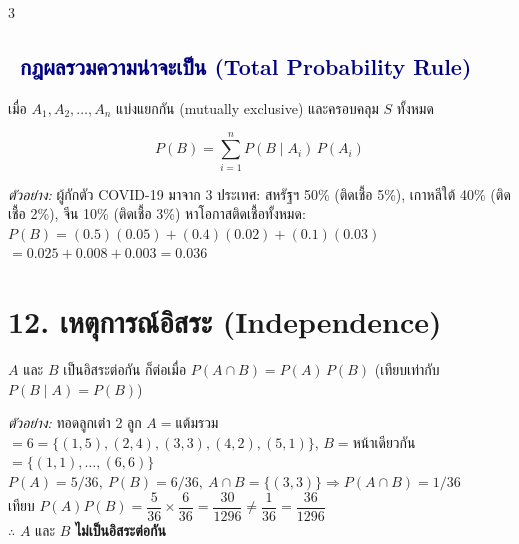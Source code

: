 \documentclass[9pt]{extarticle}
\newcommand{\dist}[1]{\subsection*{\textcolor{navy}{\textbullet\ #1}}}
\begin{document}
\begin{multicols}{3}
\dist{กฎผลรวมความน่าจะเป็น (Total Probability Rule)}
เมื่อ $A_1,A_2,\dots,A_n$ แบ่งแยกกัน (mutually exclusive) และครอบคลุม $S$ ทั้งหมด
\begin{formulabox}
$$P(B)=\sum_{i=1}^nP(B\mid A_i)\,P(A_i)$$
\end{formulabox}
\begin{solbox}
\textit{ตัวอย่าง:} ผู้กักตัว COVID-19 มาจาก 3 ประเทศ: สหรัฐฯ 50\% (ติดเชื้อ 5\%), เกาหลีใต้ 40\% (ติดเชื้อ 2\%), จีน 10\% (ติดเชื้อ 3\%) หาโอกาสติดเชื้อทั้งหมด:\\
$P(B)=(0.5)(0.05)+(0.4)(0.02)+(0.1)(0.03)$\\
$=0.025+0.008+0.003=0.036$
\end{solbox}

\section*{12. เหตุการณ์อิสระ (Independence)}
$A$ และ $B$ เป็นอิสระต่อกัน ก็ต่อเมื่อ $P(A\cap B)=P(A)\,P(B)$ (เทียบเท่ากับ $P(B\mid A)=P(B)$)
\begin{solbox}
\textit{ตัวอย่าง:} ทอดลูกเต๋า 2 ลูก $A=$แต้มรวม$=6=\{(1,5),(2,4),(3,3),(4,2),(5,1)\}$, $B=$หน้าเดียวกัน$=\{(1,1),\dots,(6,6)\}$\\
$P(A)=5/36,\ P(B)=6/36,\ A\cap B=\{(3,3)\}\Rightarrow P(A\cap B)=1/36$\\
เทียบ $P(A)P(B)=\dfrac{5}{36}{\times}\dfrac{6}{36}=\dfrac{30}{1296}\ne\dfrac{1}{36}=\dfrac{36}{1296}$\\
$\therefore$ $A$ และ $B$ \textbf{ไม่เป็นอิสระต่อกัน}
\end{solbox}


\end{multicols}
\end{document}
